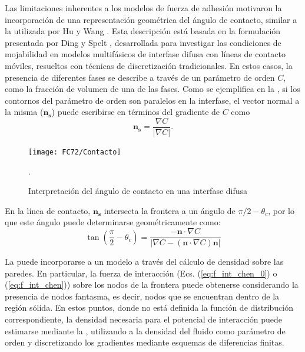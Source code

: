 Las limitaciones inherentes a los modelos de fuerza de adhesi\'on motivaron la incorporaci\'on de una representaci\'on geom\'etrica del \'angulo de contacto, similar a la utilizada por Hu \cite{hu_contact_2016} y Wang \cite{wang_scheme_2013}. Esta descripci\'on est\'a basada en la formulaci\'on presentada por Ding y Spelt \cite{ding_wetting_2007}, desarrollada para investigar las condiciones de mojabilidad en modelos multif\'asicos de interfase difusa con l\'ineas de contacto m\'oviles, resueltos con t\'ecnicas de discretizaci\'on tradicionales. En estos casos, la presencia de diferentes fases se describe a trav\'es de un par\'ametro de orden $C$, como la fracci\'on de volumen de una de las fases. Como se ejemplifica en la , si los contornos del par\'ametro de orden son paralelos en la interfase, el vector normal a la misma ($\bm{n_s}$) puede escribirse en t\'erminos del gradiente de $C$ como
\begin{equation}
	\bm{n_s} = \dfrac{\nabla C}{|\nabla C|}.
\end{equation}

\begin{figure}[ht]
	\centering
	\texttt{[image: FC72/Contacto]}
	\caption{Interpretaci\'on del \'angulo de contacto en una interfase difusa}.
	\label{fig:ding_contacto}
\end{figure}

En la l\'inea de contacto, $\bm{n_s}$ intersecta la frontera a un \'angulo de $\pi/2 - \theta_c$, por lo que este \'angulo puede determinarse geom\'etricamente como:
\begin{equation}
	\tan \left( \dfrac{\pi}{2} - \theta_c \right) = \dfrac{-\bm{n} \cdot \nabla C}{|\nabla C - (\bm{n}\cdot \nabla C)\bm{n}|}
	\label{eq:ding_angulo}
\end{equation}

La  puede incorporarse a un modelo \pp{} a trav\'es del c\'alculo de densidad sobre las paredes. En particular, la fuerza de interacci\'on (Ecs. (\ref{eq:f_int_chen_0}) o (\ref{eq:f_int_chen})) sobre los nodos de la frontera puede obtenerse considerando la presencia de nodos fantasma, es decir, nodos que se encuentran dentro de la regi\'on s\'olida. En estos puntos, donde no est\'a definida la funci\'on de distribuci\'on correspondiente, la densidad necesaria para el potencial de interacci\'on puede estimarse mediante la , utilizando a la densidad del fluido como par\'ametro de orden y discretizando los gradientes mediante esquemas de diferencias finitas. 

